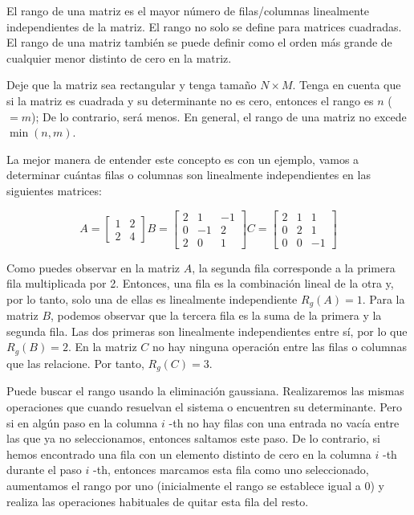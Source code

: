 El rango de una matriz es el mayor número de filas/columnas linealmente independientes de la matriz. El rango no solo se define para matrices cuadradas. El rango de una matriz también se puede definir como el orden más grande de cualquier menor distinto de cero en la matriz.

Deje que la matriz sea rectangular y tenga tamaño $ N \times M $. Tenga en cuenta que si la matriz es cuadrada y su determinante no es cero, entonces el rango es $ n $ ($ = m $); De lo contrario, será menos. En general, el rango de una matriz no excede $ \min (n, m) $.

La mejor manera de entender este concepto es con un ejemplo, vamos a determinar cuántas filas o columnas son linealmente independientes en las siguientes matrices:

$$ A = \begin{bmatrix}
	1	& 2  \\
	2	& 4 
\end{bmatrix}  
B = \begin{bmatrix}
	2	& 1 & -1 \\
	0	& -1 & 2  \\
	2	& 0 & 1 
\end{bmatrix}
C = \begin{bmatrix}
	2	& 1 & 1 \\
	0	& 2 & 1 \\
	0	& 0 & -1
\end{bmatrix}    
$$

Como puedes observar en la matriz $A$, la segunda fila corresponde a la primera fila multiplicada por 2. Entonces, una fila es la combinación lineal de la otra y, por lo tanto, solo una de ellas es linealmente independiente $R_g(A) =1$. Para la matriz $B$, podemos observar que la tercera fila es la suma de la primera y la segunda fila. Las dos primeras son linealmente independientes entre sí, por lo que $R_g(B) =2$. En la matriz $C$ no hay ninguna operación entre las filas o columnas que las relacione. Por tanto, $R_g(C) =3$. 

Puede buscar el rango usando la eliminación gaussiana. Realizaremos las mismas operaciones que cuando resuelvan el sistema o encuentren su determinante. Pero si en algún paso en la columna $ i $ -th no hay filas con una entrada no vacía entre las que ya no seleccionamos, entonces saltamos este paso. De lo contrario, si hemos encontrado una fila con un elemento distinto de cero en la columna $ i $ -th durante el paso $ i $ -th, entonces marcamos esta fila como uno seleccionado, aumentamos el rango por uno (inicialmente el rango se establece igual a $ 0 $) y realiza las operaciones habituales de quitar esta fila del resto.


